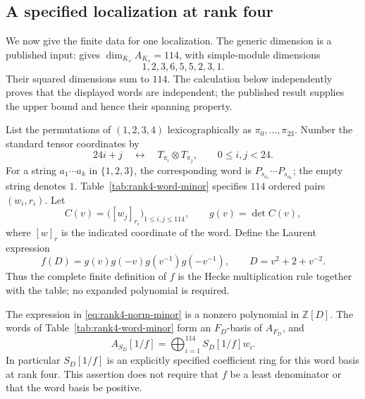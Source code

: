 \subsection{A specified localization at rank four}\label{sec:rank4-word-minor}

We now give the finite data for one localization. The generic dimension is a published input: \citet[\S11.8, pp.~67--68]{BSM2013} gives $\dim_{K_v}A_{K_v}=114$, with simple-module dimensions
\[
 1,2,3,6,5,5,2,3,1.
\]
Their squared dimensions sum to $114$. The calculation below independently proves that the displayed words are independent; the published result supplies the upper bound and hence their spanning property.

List the permutations of $(1,2,3,4)$ lexicographically as $\pi_0,\ldots,\pi_{23}$. Number the standard tensor coordinates by
\[
 24i+j\quad\longleftrightarrow\quad T_{\pi_i}\otimes T_{\pi_j},
 \qquad 0\le i,j<24.
\]
For a string $a_1\cdots a_k$ in $\{1,2,3\}$, the corresponding word is $P_{s_{a_1}}\cdots P_{s_{a_k}}$; the empty string denotes $1$. Table~\ref{tab:rank4-word-minor} specifies $114$ ordered pairs $(w_i,r_i)$. Let
\[
 C(v)=\bigl([w_j]_{r_i}\bigr)_{1\le i,j\le114},\qquad
 g(v)=\det C(v),
\]
where $[w]_{r}$ is the indicated coordinate of the word. Define the Laurent expression
\begin{equation}\label{eq:rank4-norm-minor}
 f(D)=g(v)g(-v)g(v^{-1})g(-v^{-1}),\qquad
 D=v^2+2+v^{-2}.
\end{equation}
Thus the complete finite definition of $f$ is the Hecke multiplication rule together with the table; no expanded polynomial is required.

\begin{proposition}\label{prop:rank4-word-minor}
The expression in \eqref{eq:rank4-norm-minor} is a nonzero polynomial in $\mathbb Z[D]$. The words of Table~\ref{tab:rank4-word-minor} form an $F_D$-basis of $A_{F_D}$, and
\[
 A_{S_D}[1/f]=\bigoplus_{i=1}^{114}S_D[1/f]w_i.
\]
In particular $S_D[1/f]$ is an explicitly specified coefficient ring for this word basis at rank four. This assertion does not require that $f$ be a least denominator or that the word basis be positive.
\end{proposition}

